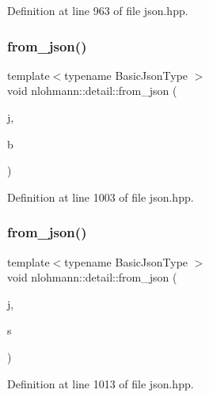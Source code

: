 Definition at line 963 of file json.\+hpp.

\mbox{\label{namespacenlohmann_1_1detail_a58117f225f43d03e3a0a4a6f3d77c9d9}} 
\subsubsection{\texorpdfstring{from\+\_\+json()}{from\_json()}\hspace{0.1cm}{\footnotesize\ttfamily [2/18]}}
{\footnotesize\ttfamily template$<$typename Basic\+Json\+Type $>$ \\
void nlohmann\+::detail\+::from\+\_\+json (\begin{DoxyParamCaption}\item[{const Basic\+Json\+Type \&}]{j,  }\item[{typename Basic\+Json\+Type\+::boolean\+\_\+t \&}]{b }\end{DoxyParamCaption})}



Definition at line 1003 of file json.\+hpp.

\mbox{\label{namespacenlohmann_1_1detail_ad74d89f77ada7a57eff38b43d4bf2335}} 
\subsubsection{\texorpdfstring{from\+\_\+json()}{from\_json()}\hspace{0.1cm}{\footnotesize\ttfamily [3/18]}}
{\footnotesize\ttfamily template$<$typename Basic\+Json\+Type $>$ \\
void nlohmann\+::detail\+::from\+\_\+json (\begin{DoxyParamCaption}\item[{const Basic\+Json\+Type \&}]{j,  }\item[{typename Basic\+Json\+Type\+::string\+\_\+t \&}]{s }\end{DoxyParamCaption})}



Definition at line 1013 of file json.\+hpp.

\mbox{\label{namespacenlohmann_1_1detail_a87c6703c031f86b349cccb486c5730f7}} 
